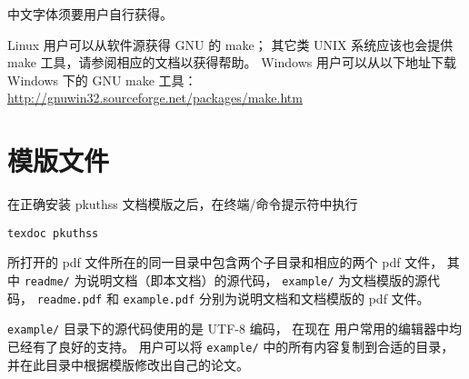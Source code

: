 中文字体须要用户自行获得。

Linux 用户可以从软件源获得 GNU 的 make；
其它类 UNIX 系统应该也会提供 make 工具，请参阅相应的文档以获得帮助。%
Windows 用户可以从以下地址下载 Windows 下的 GNU make 工具：\\
\hspace*{\parindent}%
\url{http://gnuwin32.sourceforge.net/packages/make.htm}

\section{模版文件}\label{sec:doc-dir}

在正确安装 pkuthss 文档模版之后，在终端/命令提示符中执行
\begin{Verbatim}
texdoc pkuthss
\end{Verbatim}
所打开的 pdf 文件所在的同一目录中包含两个子目录和相应的两个 pdf 文件，
其中 \verb|readme/| 为说明文档（即本文档）的源代码，%
\verb|example/| 为文档模版的源代码，%
\verb|readme.pdf| 和 \verb|example.pdf|
分别为说明文档和文档模版的 pdf 文件。

\verb|example/| 目录下的源代码使用的是 UTF-8 编码，
在现在  用户常用的编辑器中均已经有了良好的支持。
用户可以将 \verb|example/| 中的所有内容复制到合适的目录，
并在此目录中根据模版修改出自己的论文。


